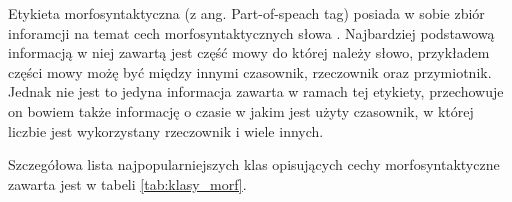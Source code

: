 
Etykieta morfosyntaktyczna (z ang. Part-of-speach tag) posiada w sobie zbiór inforamcji na temat cech morfosyntaktycznych słowa \cite{postags_def}. Najbardziej podstawową informacją w niej zawartą jest część mowy do której należy słowo, przykładem części mowy możę być między innymi czasownik, rzeczownik oraz przymiotnik. Jednak nie jest to jedyna informacja zawarta w ramach tej etykiety, przechowuje on bowiem także informację o czasie w jakim jest użyty czasownik, w której liczbie jest wykorzystany rzeczownik i wiele innych.

Szczegółowa lista najpopularniejszych klas opisujących cechy morfosyntaktyczne zawarta jest w tabeli \ref{tab:klasy_morf}.


